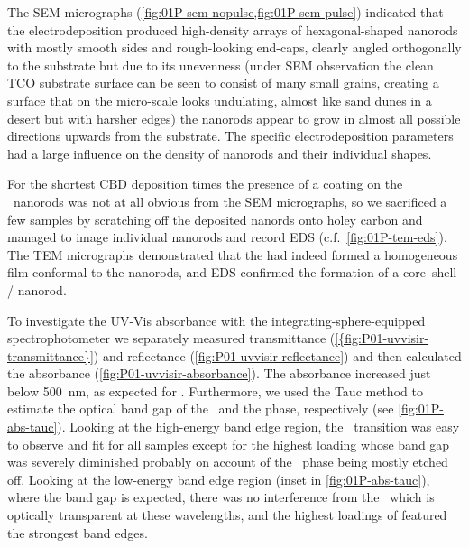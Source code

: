 \documentclass[webedition,openright,titles,swedish,english]{LuaUUThesis}\usepackage[]{graphicx}\usepackage[]{xcolor}
\newcommand{\cf}{c.f.}
\begin{document}
The \gls{SEM} micrographs (\cref{fig:01P-sem-nopulse,fig:01P-sem-pulse})
indicated that the electrodeposition produced high-density
arrays of hexagonal-shaped nanorods with mostly smooth sides and rough-looking end-caps,
clearly angled orthogonally to the  substrate but due to its
unevenness (under \gls{SEM} observation the clean \gls{TCO} substrate surface
can be seen to consist of many small grains, creating a surface that on the
micro-scale looks undulating, almost like sand dunes in a desert but with harsher edges)
the nanorods appear to grow in almost all possible directions upwards from the substrate.
The specific electrodeposition parameters had a large influence on the density
of nanorods and their individual shapes.


For the shortest \gls{CBD} deposition times the presence of a  coating
on the \ZnO\ nanorods was not at all obvious from the \gls{SEM} micrographs,
so we sacrificed a few samples by scratching off the deposited nanords onto holey carbon
and managed to image individual nanorods and record \gls{EDS} (\cf\ \cref{fig:01P-tem-eds}).
The \gls{TEM} micrographs demonstrated that the  had indeed formed a
homogeneous film conformal to the nanorods, and \gls{EDS} confirmed
the formation of a core--shell \ZnO/ nanorod.

To investigate the \gls{UV-Vis} absorbance with the integrating-sphere-equipped
spectrophotometer we separately measured transmittance (\cref{{fig:P01-uvvisir-transmittance}})
and reflectance (\cref{fig:P01-uvvisir-reflectance}) and then calculated
the absorbance (\cref{fig:P01-uvvisir-absorbance}).
The absorbance increased just below \qty{500}{\nm}, as expected for .
Furthermore, we used the Tauc method to estimate the optical band gap of the
\zincox\ and the  phase, respectively (see \cref{fig:01P-abs-tauc}).
Looking at the high-energy band edge region, the \zincox\ transition was easy to
observe and fit for all samples except for the highest  loading whose
band gap was severely diminished probably on account of the \zincox\ phase
being mostly etched off.
Looking at the low-energy band edge region (inset in \cref{fig:01P-abs-tauc}),
where the  band gap is expected, there was no interference from the \zincox\
which is optically transparent at these wavelengths, and the highest loadings
of \ch{CdS} featured the strongest band edges.

%
\end{document}
